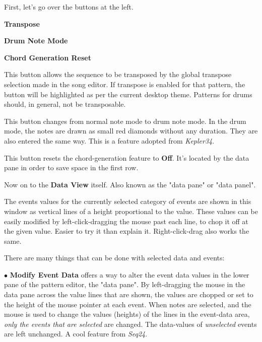    First, let's go over the buttons at the left.

   \begin{enumber}
      \item \textbf{Transpose}
      \item \textbf{Drum Note Mode}
      \item \textbf{Chord Generation Reset}
   \end{enumber}

   This button allows the sequence to be transposed by
   the global transpose selection made in the song editor.  If transpose is
   enabled for that pattern, the button will be highlighted as per the current
   desktop theme.  Patterns for drums should, in general, not be transposable.

   This button changes from normal note mode to drum note mode. In the drum
   mode, the notes are drawn as small red diamonds without any duration.
   They are also entered the same way.
   This is a feature adopted from \textsl{Kepler34}.

   This button resets the chord-generation feature to \textbf{Off}.
   It's located by the data pane in order to save space in the first row.

   Now on to the \textbf{Data View} itself.
   Also known as the "data pane"
   or "data panel".

   The events values for the currently selected category of events are shown
   in this window as vertical lines of a height proportional to the value.
   These values can be easily modified by
   left-click-dragging the
   mouse past each line, to chop it off at the given value.  Easier to try
   it than explain it.
   Right-click-drag also works the same.

   There are many things that can be done with selected data and events:

   $\bullet$ \textbf{Modify Event Data} offers a way to
   alter the event data values in 
   the lower pane of the pattern editor, the "data pane".
   By left-dragging the mouse in the data pane across the value lines that are
   shown, the values are chopped or set to the height of the mouse pointer at
   each event.
   When notes are selected, and the
   mouse is used to change the values (heights) of the lines in the event-data
   area,
   \textsl{only the events that are selected} are changed.  The data-values of
   \textsl{unselected} events are left unchanged.
   A cool feature from \textsl{Seq24}.

